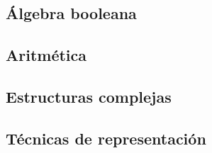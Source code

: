 \subsection{Álgebra booleana} \label{sec:1.3.1}

\subsection{Aritmética} \label{sec:1.3.2}

\subsection{Estructuras complejas} \label{sec:1.3.3}

\subsection{Técnicas de representación} \label{sec:1.3.4}

